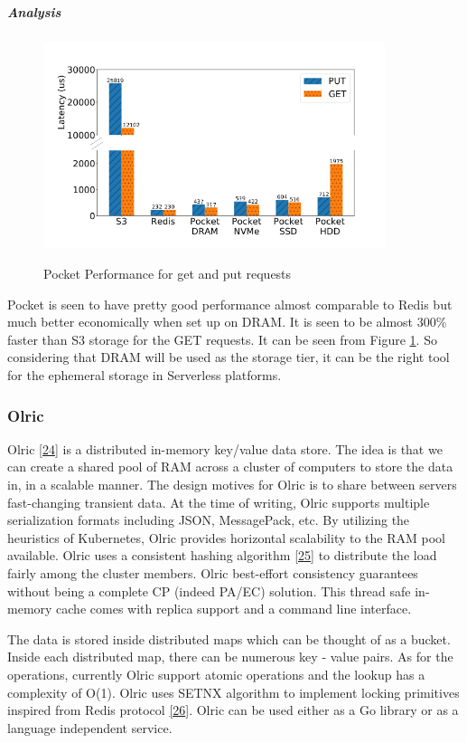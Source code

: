 \documentclass[12pt,titlepage]{article}
\begin{document}
\subparagraph{Analysis}
\label{sec:org7740872}
\begin{figure}[!h]
    \caption{Pocket Performance for get and put requests}
    \centering
    \includegraphics[width=100mm]{./thesis_images/pocket_perf.png}
    \label{fig:pocket_perf}
\end{figure}

Pocket is seen to have pretty good performance almost comparable to Redis but
much better economically when set up on DRAM. It is seen to be almost 300\%
faster than S3 storage for the GET requests. It can be seen from Figure \ref{fig:pocket_perf}.
So considering that DRAM will be used as the storage tier, it can be the
right tool for the ephemeral storage in Serverless platforms.

\subsubsection{Olric}
\label{sec:org27c8ded}
Olric \hyperref[ref:24]{[24}] is a distributed in-memory key/value data store. The idea is
that we can create a shared pool of RAM across a cluster of computers to store
the data in, in a scalable manner. The design motives for Olric is to share
between servers fast-changing transient data. At the time of writing, Olric
supports multiple serialization formats including JSON, MessagePack, etc. By
utilizing the heuristics of Kubernetes, Olric provides horizontal scalability to
the RAM pool available. Olric uses a consistent hashing algorithm \hyperref[ref:25]{[25}] to distribute
the load fairly among the cluster members. Olric best-effort consistency
guarantees without being a complete CP (indeed PA/EC) solution. This thread safe
in-memory cache comes with replica support and a command line interface.

The data is stored inside distributed maps which can be thought of as a bucket.
Inside each distributed map, there can be numerous key - value pairs. As for the
operations, currently Olric support atomic operations and the lookup
has a complexity of O(1). Olric uses SETNX algorithm to implement locking
primitives inspired from Redis protocol \hyperref[ref:26]{[26}]. Olric can be used either as a
Go library or as a language independent service.
\end{document}
